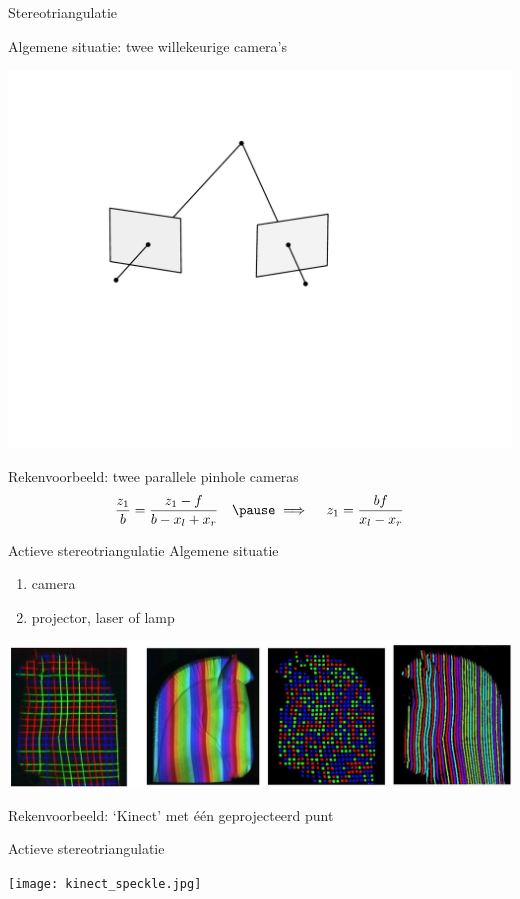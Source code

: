\documentclass{beamer}
\begin{document}
\begin{frame}{Stereotriangulatie}

{\large Algemene situatie: twee willekeurige camera's}

\centerline{\includegraphics[scale=0.4, clip=true, viewport= 120 230 470 470]{triang}}
\vfill
\pause
{\large Rekenvoorbeeld: twee parallele pinhole cameras}
\pause
$$
\frac{z_1}{b} = \frac{z_1 - f}{b-x_l+x_r}\quad \pause\implies\quad z_1 = \frac {bf} {x_l - x_r}
$$
\end{frame}

\begin{frame}{Actieve stereotriangulatie}{}
{\large Algemene situatie}
\begin{enumerate}
\item camera
\item projector, laser of lamp
\end{enumerate}
\vfill
\pause
\centerline{\includegraphics[scale=0.2]{structuredlight.jpg}}
\vfill
{\large Rekenvoorbeeld: `Kinect' met \'e\'en geprojecteerd punt}
\end{frame}

\begin{frame}{Actieve stereotriangulatie}\vspace{-4pt}
\centerline{\texttt{[image: kinect\_speckle.jpg]}}
\end{frame}
\end{document}
